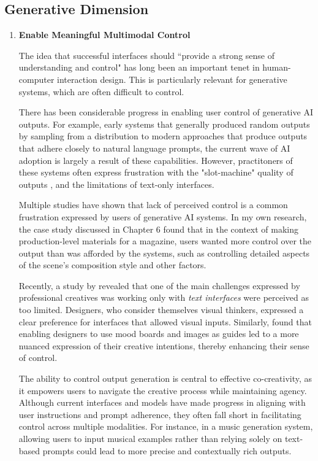 \subsection{Generative Dimension}

\begin{enumerate}

\item \textbf{Enable Meaningful Multimodal Control}

The idea that successful  interfaces  should  “provide  a  strong  sense  of  understanding  and  control" \cite{Donald1986-hx} has long been an important tenet in human-computer interaction design. This is particularly relevant for generative systems, which are often difficult to control. 

There has been considerable progress in enabling user control of generative AI outputs. For example, early systems that generally produced random outputs by sampling from a distribution \cite{Goodfellow2016-su} to modern approaches that produce outputs that adhere closely to natural language prompts, the current wave of AI adoption is largely a result of these capabilities. However, practitoners of these systems often express frustration with the "slot-machine" quality of outputs \cite{Nebelong2023-rb}, and the limitations of text-only interfaces. 

Multiple studies have shown that lack of perceived control is a common frustration expressed by users of generative AI systems. 
In my own research, the case study discussed in Chapter 6 \cite{Ocampo2024-dv} found that in the context of making production-level materials for a magazine, users wanted more control over the output than was afforded by the systems, such as controlling detailed aspects of the scene's composition style and other factors. 

Recently, a study by \cite{Park2024-gw} revealed that one of the main challenges expressed by professional creatives was working only with \textit{text interfaces} were perceived as too limited. Designers, who consider themselves visual thinkers, expressed a clear preference for interfaces that allowed visual inputs. Similarly, \cite{Peng2024-tr} found that enabling designers to use mood boards and images as guides led to a more nuanced expression of their creative intentions, thereby enhancing their sense of control. 

The ability to control output generation is central to effective co-creativity, as it empowers users to navigate the creative process while maintaining agency. Although current interfaces and models have made progress in aligning with user instructions and prompt adherence, they often fall short in facilitating control across multiple modalities. For instance, in a music generation system, allowing users to input musical examples rather than relying solely on text-based prompts could lead to more precise and contextually rich outputs.


\end{enumerate}
